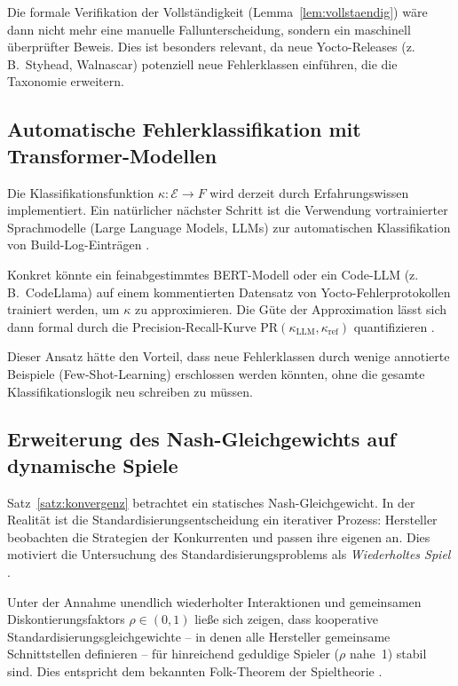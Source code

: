 ﻿\documentclass[a4paper,12pt]{article}
\theoremstyle{definition}
\begin{document}
Die formale Verifikation der Vollständigkeit (Lemma~\ref{lem:vollstaendig}) wäre dann
nicht mehr eine manuelle Fallunterscheidung, sondern ein maschinell überprüfter Beweis.
Dies ist besonders relevant, da neue Yocto-Releases (z.\,B.\ Styhead, Walnascar)
potenziell neue Fehlerklassen einführen, die die Taxonomie erweitern.

\subsection{Automatische Fehlerklassifikation mit Transformer-Modellen}

Die Klassifikationsfunktion $\kappa: \mathcal{E} \to F$ wird derzeit durch
Erfahrungswissen implementiert. Ein natürlicher nächster Schritt ist die
Verwendung vortrainierter Sprachmodelle (Large Language Models, LLMs) zur
automatischen Klassifikation von Build-Log-Einträgen \cite{devlin2019bert}.

Konkret könnte ein feinabgestimmtes BERT-Modell oder ein Code-LLM (z.\,B.\ CodeLlama)
auf einem kommentierten Datensatz von Yocto-Fehlerprotokollen trainiert werden,
um $\kappa$ zu approximieren. Die Güte der Approximation lässt sich dann formal
durch die Precision-Recall-Kurve $\mathrm{PR}(\kappa_{\mathrm{LLM}}, \kappa_{\mathrm{ref}})$
quantifizieren \cite{manning2008}.

Dieser Ansatz hätte den Vorteil, dass neue Fehlerklassen durch wenige annotierte
Beispiele (Few-Shot-Learning) erschlossen werden könnten, ohne die gesamte
Klassifikationslogik neu schreiben zu müssen.

\subsection{Erweiterung des Nash-Gleichgewichts auf dynamische Spiele}

Satz~\ref{satz:konvergenz} betrachtet ein statisches Nash-Gleichgewicht.
In der Realität ist die Standardisierungsentscheidung ein iterativer Prozess:
Hersteller beobachten die Strategien der Konkurrenten und passen ihre eigenen an.
Dies motiviert die Untersuchung des Standardisierungsproblems als
\emph{Wiederholtes Spiel} \cite{fudenberg1991}.

Unter der Annahme unendlich wiederholter Interaktionen und gemeinsamen Diskontierungsfaktors
$\rho \in (0,1)$ ließe sich zeigen, dass kooperative Standardisierungsgleichgewichte
-- in denen alle Hersteller gemeinsame Schnittstellen definieren -- für hinreichend
geduldige Spieler ($\rho$ nahe~1) stabil sind. Dies entspricht dem bekannten
Folk-Theorem der Spieltheorie \cite{aumann1994}.
\end{document}
